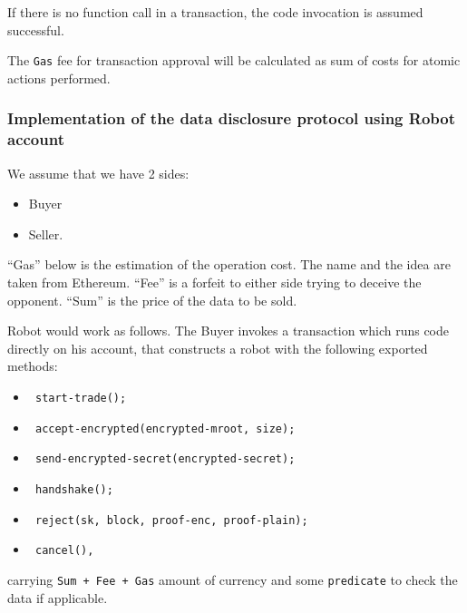If there is no function call in a transaction, the code invocation is assumed successful.

The \verb|Gas| fee for transaction approval will be calculated as sum of costs for atomic actions performed.

\subsubsection{Implementation of the data disclosure protocol using Robot account}

We assume that we have 2 sides:
\begin{itemize}
  \item Buyer
  \item Seller.
\end{itemize}

``Gas'' below is the estimation of the operation cost. The name and the idea are taken from Ethereum.
``Fee'' is a forfeit to either side trying to deceive the opponent.
``Sum'' is the price of the data to be sold.

Robot would work as follows. The Buyer invokes a transaction which runs code directly on his account, that constructs a robot with the following exported methods:

\begin{itemize}
  \item \begin{verbatim} start-trade(); \end{verbatim}
  \item \begin{verbatim} accept-encrypted(encrypted-mroot, size); \end{verbatim}
  \item \begin{verbatim} send-encrypted-secret(encrypted-secret); \end{verbatim}
  \item \begin{verbatim} handshake(); \end{verbatim}
  \item \begin{verbatim} reject(sk, block, proof-enc, proof-plain); \end{verbatim}
  \item \begin{verbatim} cancel(), \end{verbatim}
\end{itemize}
carrying \verb|Sum + Fee + Gas| amount of currency and some \verb|predicate| to check the data if applicable.


